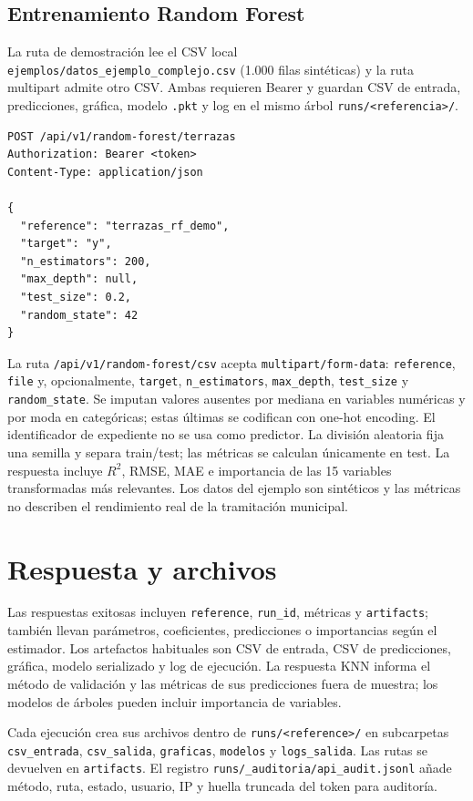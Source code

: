 \documentclass[11pt,a4paper]{article}
\begin{document}
\subsection{Entrenamiento Random Forest}
La ruta de demostración lee el CSV local \texttt{ejemplos/datos\_ejemplo\_complejo.csv} (1.000 filas sintéticas) y la ruta multipart admite otro CSV. Ambas requieren Bearer y guardan CSV de entrada, predicciones, gráfica, modelo \texttt{.pkt} y log en el mismo árbol \texttt{runs/<referencia>/}.

\begin{lstlisting}
POST /api/v1/random-forest/terrazas
Authorization: Bearer <token>
Content-Type: application/json

{
  "reference": "terrazas_rf_demo",
  "target": "y",
  "n_estimators": 200,
  "max_depth": null,
  "test_size": 0.2,
  "random_state": 42
}
\end{lstlisting}
La ruta \texttt{/api/v1/random-forest/csv} acepta \texttt{multipart/form-data}: \texttt{reference}, \texttt{file} y, opcionalmente, \texttt{target}, \texttt{n\_estimators}, \texttt{max\_depth}, \texttt{test\_size} y \texttt{random\_state}. Se imputan valores ausentes por mediana en variables numéricas y por moda en categóricas; estas últimas se codifican con one-hot encoding. El identificador de expediente no se usa como predictor. La división aleatoria fija una semilla y separa train/test; las métricas se calculan únicamente en test. La respuesta incluye $R^2$, RMSE, MAE e importancia de las 15 variables transformadas más relevantes. Los datos del ejemplo son sintéticos y las métricas no describen el rendimiento real de la tramitación municipal.

\section{Respuesta y archivos}
Las respuestas exitosas incluyen \texttt{reference}, \texttt{run\_id}, métricas y \texttt{artifacts}; también llevan parámetros, coeficientes, predicciones o importancias según el estimador. Los artefactos habituales son CSV de entrada, CSV de predicciones, gráfica, modelo serializado y log de ejecución. La respuesta KNN informa el método de validación y las métricas de sus predicciones fuera de muestra; los modelos de árboles pueden incluir importancia de variables.

Cada ejecución crea sus archivos dentro de \texttt{runs/<reference>/} en subcarpetas \texttt{csv\_entrada}, \texttt{csv\_salida}, \texttt{graficas}, \texttt{modelos} y \texttt{logs\_salida}. Las rutas se devuelven en \texttt{artifacts}. El registro \texttt{runs/\_auditoria/api\_audit.jsonl} añade método, ruta, estado, usuario, IP y huella truncada del token para auditoría.
\end{document}
